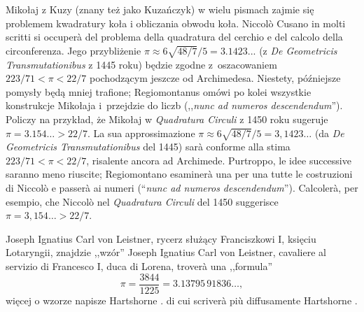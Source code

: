 Mikołaj z Kuzy (znany też jako Kuzańczyk) w wielu pismach zajmie się problemem kwadratury koła i obliczania obwodu koła. %
Niccolò Cusano in molti scritti si occuperà del problema della quadratura del cerchio e del calcolo della circonferenza. %
Jego przybliżenie $\pi \approx 6\sqrt{48/7}/5 = 3.1423...$ (z \emph{De Geometricis Transmutationibus} z 1445 roku) będzie zgodne z~oszacowaniem $223/71 < \pi < 22/7$ pochodzącym jeszcze od Archimedesa. %
Niestety, późniejsze pomysły będą mniej trafione;  Regiomontanus omówi po kolei wszystkie konstrukcje Mikołaja i~przejdzie do liczb (,,\emph{nunc ad numeros descendendum}''). %
Policzy na przykład, że Mikołaj w \emph{Quadratura Circuli} z 1450 roku sugeruje $\pi = 3.154\ldots > 22/7$. %
La sua approssimazione $\pi \approx 6\sqrt{48/7}/5 = 3{,}1423\ldots$ (da \emph{De Geometricis Transmutationibus} del 1445) sarà conforme alla stima $223/71 < \pi < 22/7$, risalente ancora ad Archimede. %
Purtroppo, le idee successive saranno meno riuscite; Regiomontano esaminerà una per una tutte le costruzioni di Niccolò e passerà ai numeri (``\emph{nunc ad numeros descendendum}''). %
Calcolerà, per esempio, che Niccolò nel \emph{Quadratura Circuli} del 1450 suggerisce $\pi = 3{,}154\ldots > 22/7$. %


Joseph Ignatius Carl von Leistner, rycerz służący Franciszkowi I, księciu Lotaryngii, znajdzie ,,wzór'' %
Joseph Ignatius Carl von Leistner, cavaliere al servizio di Francesco I, duca di Lorena, troverà una ,,formula'' %
\begin{equation}
    \pi = \frac{3844}{1225} = 3.13795\,91836\ldots,
\end{equation}
więcej o wzorze napisze Hartshorne \cite[s. 224]{hartshorne_2000}. %
di cui scriverà più diffusamente Hartshorne \cite[p. 224]{hartshorne_2000}. %

